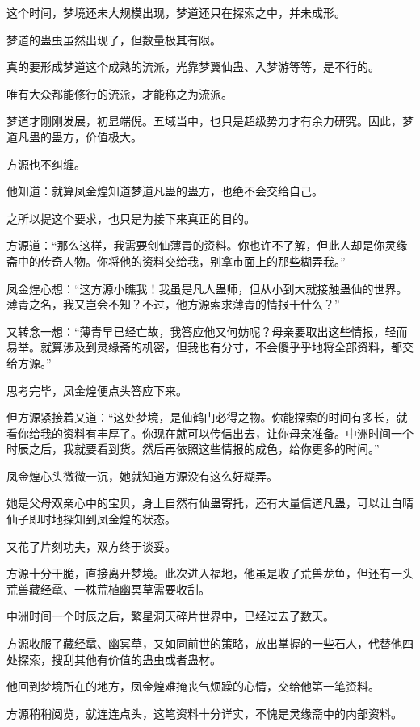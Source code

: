\begin{this_body}
这个时间，梦境还未大规模出现，梦道还只在探索之中，并未成形。

梦道的蛊虫虽然出现了，但数量极其有限。

真的要形成梦道这个成熟的流派，光靠梦翼仙蛊、入梦游等等，是不行的。

唯有大众都能修行的流派，才能称之为流派。

梦道才刚刚发展，初显端倪。五域当中，也只是超级势力才有余力研究。因此，梦道凡蛊的蛊方，价值极大。

方源也不纠缠。

他知道：就算凤金煌知道梦道凡蛊的蛊方，也绝不会交给自己。

之所以提这个要求，也只是为接下来真正的目的。

方源道：“那么这样，我需要剑仙薄青的资料。你也许不了解，但此人却是你灵缘斋中的传奇人物。你将他的资料交给我，别拿市面上的那些糊弄我。”

凤金煌心想：“这方源小瞧我！我虽是凡人蛊师，但从小到大就接触蛊仙的世界。薄青之名，我又岂会不知？不过，他方源索求薄青的情报干什么？”

又转念一想：“薄青早已经亡故，我答应他又何妨呢？母亲要取出这些情报，轻而易举。就算涉及到灵缘斋的机密，但我也有分寸，不会傻乎乎地将全部资料，都交给方源。”

思考完毕，凤金煌便点头答应下来。

但方源紧接着又道：“这处梦境，是仙鹤门必得之物。你能探索的时间有多长，就看你给我的资料有丰厚了。你现在就可以传信出去，让你母亲准备。中洲时间一个时辰之后，我就要看到货。然后再依照这些情报的成色，给你更多的时间。”

凤金煌心头微微一沉，她就知道方源没有这么好糊弄。

她是父母双亲心中的宝贝，身上自然有仙蛊寄托，还有大量信道凡蛊，可以让白晴仙子即时地探知到凤金煌的状态。

又花了片刻功夫，双方终于谈妥。

方源十分干脆，直接离开梦境。此次进入福地，他虽是收了荒兽龙鱼，但还有一头荒兽藏经鼋、一株荒植幽冥草需要收刮。

中洲时间一个时辰之后，繁星洞天碎片世界中，已经过去了数天。

方源收服了藏经鼋、幽冥草，又如同前世的策略，放出掌握的一些石人，代替他四处探索，搜刮其他有价值的蛊虫或者蛊材。

他回到梦境所在的地方，凤金煌难掩丧气烦躁的心情，交给他第一笔资料。

方源稍稍阅览，就连连点头，这笔资料十分详实，不愧是灵缘斋中的内部资料。


\end{this_body}
